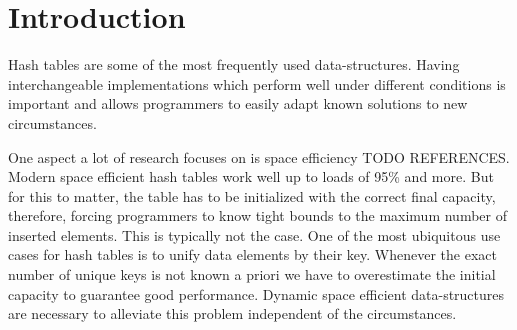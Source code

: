 \documentclass[a4paper,UKenglish]{lipics-v2016}
\begin{document}

\section{Introduction}
Hash tables are some of the most frequently used data-structures. Having
interchangeable implementations which perform well under different
conditions is important and allows programmers to easily adapt known
solutions to new circumstances.

One aspect a lot of research focuses on is space efficiency TODO
REFERENCES.  Modern space efficient hash tables work well up to loads
of 95\% and more.  But for this to matter, the table has to be
initialized with the correct final capacity, therefore, forcing
programmers to know tight bounds to the maximum number of inserted
elements.  This is typically not the case.  One of the most ubiquitous
use cases for hash tables is to unify data elements by their key.
Whenever the exact number of unique keys is not known a priori we have
to overestimate the initial capacity to guarantee good performance.
Dynamic space efficient data-structures are necessary to alleviate
this problem independent of the circumstances.
\end{document}
